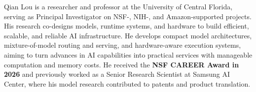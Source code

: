 Qian Lou is a researcher and professor at the University of Central Florida, serving as Principal Investigator on NSF-, NIH-, and Amazon-supported projects. His research co-designs models, runtime systems, and hardware to build efficient, scalable, and reliable AI infrastructure. He develops compact model architectures, mixture-of-model routing and serving, and hardware-aware execution systems, aiming to turn advances in AI capabilities into practical services with manageable computation and memory costs. He received the \textbf{NSF CAREER Award in 2026} and previously worked as a Senior Research Scientist at Samsung AI Center, where his model research contributed to patents and product translation.
